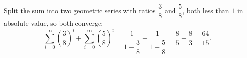 Split the sum into two geometric series with ratios $\dfrac{3}{8}$ and $\dfrac{5}{8}$, both less than $1$ in absolute value, so both converge:
\[\sum_{i=0}^{\infty}\left(\dfrac{3}{8}\right)^i+\sum_{i=0}^{\infty}\left(\dfrac{5}{8}\right)^i=\dfrac{1}{1-\dfrac{3}{8}}+\dfrac{1}{1-\dfrac{5}{8}}=\dfrac{8}{5}+\dfrac{8}{3}=\boxed{\dfrac{64}{15}}.\]
